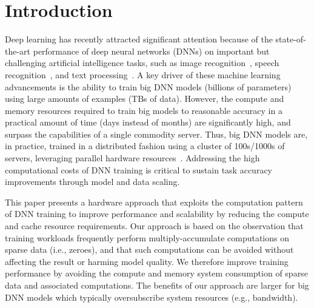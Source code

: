 \section{Introduction}
Deep learning has recently attracted significant attention because of the state-of-the-art performance of deep neural networks (DNNs) on important but challenging artificial intelligence tasks, such as image recognition~\cite{Krizhevsky12, Le12, Dean12, Chilimbi14}, speech recognition~\cite{Dahl12, Hinton12, hannun2014deepspeech}, and text processing~\cite{collobert2008, Collobert11, mikolov2013}.  A key driver of these machine learning advancements is the ability to train big DNN models (billions of parameters) using large amounts of examples (TBs of data).   However, the compute and memory resources required to train big models to reasonable accuracy in a practical amount of time (days instead of months) are significantly high, and surpass the capabilities of a single commodity server.  Thus, big DNN models are, in practice, trained in a distributed fashion using a cluster of 100s/1000s of servers, leveraging parallel hardware resources~\cite{Dean12, Chilimbi14}.  Addressing the high computational costs of DNN training is critical to sustain task accuracy improvements through model and data scaling.

This paper presents a hardware approach that exploits the computation pattern of DNN training to improve performance and scalability by reducing the compute and cache resource requirements.  Our approach is based on the observation that training workloads frequently perform multiply-accumulate 
computations on sparse data (i.e., zeroes), and that such computations can be avoided without affecting the result or harming model quality.  We therefore improve training performance by avoiding the compute and memory system consumption of sparse data and associated computations. The benefits of our approach are larger for big DNN models which typically oversubscribe system resources (e.g., bandwidth). 


